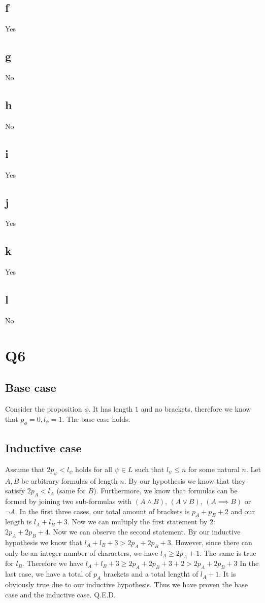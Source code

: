 \documentclass[12pt]{article}
\begin{document}
\subsection{f}
Yes
\subsection{g}
No
\subsection{h}
No
\subsection{i}
Yes
\subsection{j}
Yes
\subsection{k}
Yes
\subsection{l}
No

\section{Q6}
\subsection{Base case}
Consider the proposition $\phi$. It has length $1$ and no brackets, therefore we know that
$p_\phi = 0, l_\phi = 1$. The base case holds.

\subsection{Inductive case}
Assume that $2p_\psi<l_\psi$ holds for all $\psi \in L$ such that $l_\psi \leq n$ for some natural $n$.
\newline
Let $A, B$ be arbitrary formulas of length $n$. By our hypothesis we know that they satisfy $2p_A<l_A$ (same for $B$). Furthermore, we know that formulas can be formed by joining two sub-formulas with $(A \land B)$, $(A \lor B)$,
$(A \implies B)$ or $\neg A$. In the first three cases, our total amount of brackets is $p_A+p_B+2$ and our length is $l_A+l_B+3$. Now we can multiply the first statement by 2: $2p_A+2p_B+4$. Now we can observe the second statement. By our inductive hypothesis we know that $l_A+l_B+3 > 2p_A+2p_B+3$. However, since there can only be an integer number of characters, we have $l_A \geq 2p_A + 1$. The same is true for $l_B$. Therefore we have $l_A+l_B+3 \geq 2p_A+2p_B+3+2 > 2p_A+2p_B+3 $
In the last case, we have a total of $p_A$ brackets and a total lengtht of $l_A+1$. It is obviously true due to our inductive hypothesis.
\newline
Thus we have proven the base case and the inductive case.
\newline
Q.E.D.
\end{document}
